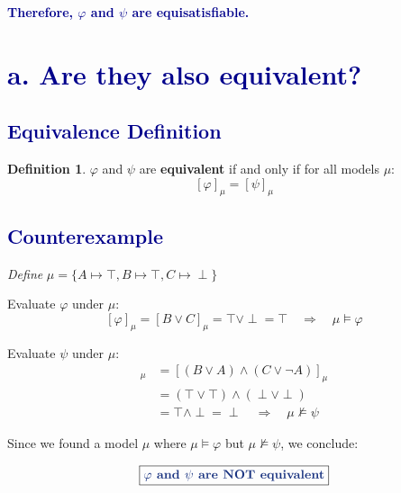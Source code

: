 \documentclass[12pt]{article}
\theoremstyle{definition}
\newtheorem*{defn}{Definition}
\theoremstyle{plain}
\begin{document}
\vspace{0.3cm}
\noindent
\textbf{\textcolor{darkblue}{Therefore, $\varphi$ and $\psi$ are equisatisfiable.}}

\newpage

\section*{\textcolor{darkblue}{a. Are they also equivalent?}}

\subsection*{\textcolor{darkblue}{Equivalence Definition}}

\begin{defn}
$\varphi$ and $\psi$ are \textbf{equivalent} if and only if for all models $\mu$:
\[
[\varphi]_\mu = [\psi]_\mu
\]
\end{defn}

\subsection*{\textcolor{darkblue}{Counterexample}}

\vspace{0.5cm}
\begin{tcolorbox}[colback=lightgray, colframe=darkblue, boxrule=1pt]
\textit{Define} $\mu = \{A \mapsto \top, B \mapsto \top, C \mapsto \perp\}$
\end{tcolorbox}

\vspace{0.3cm}
\noindent
Evaluate $\varphi$ under $\mu$:
\[
[\varphi]_\mu = [B \vee C]_\mu = \top \vee \perp = \top \quad \Rightarrow \quad \mu \models \varphi
\]

\vspace{0.3cm}
\noindent
Evaluate $\psi$ under $\mu$:
\begin{align*}
[\psi]_\mu &= [(B \vee A) \wedge (C \vee \neg A)]_\mu \\
&= (\top \vee \top) \wedge (\perp \vee \perp) \\
&= \top \wedge \perp = \perp \quad \Rightarrow \quad \mu \not\models \psi
\end{align*}

\vspace{0.5cm}
\noindent
Since we found a model $\mu$ where $\mu \models \varphi$ but $\mu \not\models \psi$, we conclude:

\vspace{0.3cm}
\[
\boxed{\textbf{\textcolor{darkblue}{$\varphi$ and $\psi$ are NOT equivalent}}}
\]
\end{document}

